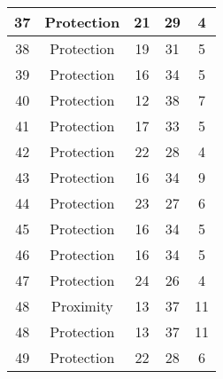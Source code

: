 \documentclass[results.tex]{subfiles}
\begin{document}
\begin{center}
\begin{tabular}{| c || c | c | c | c |}
            \hline
            37                      & Protection                   & 21                     & 29                      & 4                    \\
            \hline
            38                      & Protection                   & 19                     & 31                      & 5                    \\
            \hline
            39                      & Protection                   & 16                     & 34                      & 5                    \\
            \hline
            40                      & Protection                   & 12                     & 38                      & 7                    \\
            \hline
            41                      & Protection                   & 17                     & 33                      & 5                    \\
            \hline
            42                      & Protection                   & 22                     & 28                      & 4                    \\
            \hline
            43                      & Protection                   & 16                     & 34                      & 9                    \\
            \hline
            44                      & Protection                   & 23                     & 27                      & 6                    \\
            \hline
            45                      & Protection                   & 16                     & 34                      & 5                    \\
            \hline
            46                      & Protection                   & 16                     & 34                      & 5                    \\
            \hline
            47                      & Protection                   & 24                     & 26                      & 4                    \\
            \hline
            48                      & Proximity                    & 13                     & 37                      & 11                   \\
            \hline
            48                      & Protection                   & 13                     & 37                      & 11                   \\
            \hline
            49                      & Protection                   & 22                     & 28                      & 6                    \\
            \hline
        \end{tabular}
    \end{center}
\end{document}
